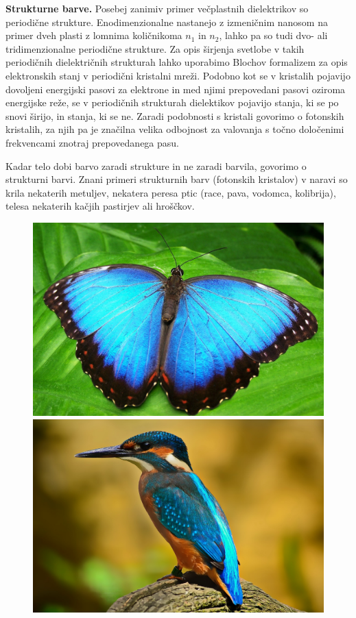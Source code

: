 \begin{example}{\bf Strukturne barve.}
Posebej zanimiv primer večplastnih dielektrikov so periodične strukture. Enodimenzionalne 
nastanejo z izmeničnim nanosom na primer dveh plasti z lomnima količnikoma $n_1$ in $n_2$, 
lahko pa so tudi dvo- ali tridimenzionalne periodične strukture. Za opis širjenja svetlobe v
 takih periodičnih dielektričnih strukturah lahko uporabimo Blochov formalizem za opis elektronskih 
 stanj v periodični 
kristalni mreži. Podobno kot se v kristalih pojavijo dovoljeni energijski pasovi za elektrone 
in med njimi prepovedani pasovi oziroma energijske reže, se v periodičnih strukturah dielektikov
pojavijo stanja, ki se po snovi širijo, in stanja, ki se ne. Zaradi podobnosti s kristali
govorimo o fotonskih kristalih, za njih pa je značilna velika odbojnost za valovanja s točno
določenimi frekvencami znotraj prepovedanega pasu. 

Kadar telo dobi barvo zaradi strukture in ne zaradi barvila, govorimo o strukturni barvi. 
Znani primeri strukturnih barv (fotonskih kristalov) v naravi so krila nekaterih metuljev, 
nekatera peresa ptic (race, pava, vodomca, kolibrija), telesa nekaterih kačjih pastirjev ali hroščkov. 
\begin{figure}[!h]
\centering
\includegraphics[width=7truecm]{slike/06_metulj.jpg}\hfill
\includegraphics[width=7truecm]{slike/06_vodomec.jpg}\newline


\end{figure}
\end{example}
